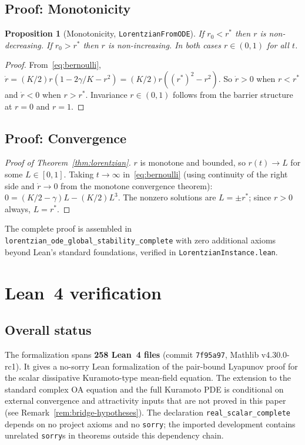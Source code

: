\documentclass[11pt,a4paper]{article}
\newtheorem{proposition}[theorem]{Proposition}
\theoremstyle{definition}
\begin{document}
\subsection{Proof: Monotonicity}\label{sec:mono}

\begin{proposition}[Monotonicity, \texttt{LorentzianFromODE}]\label{prop:mono}
If $r_0 < r^*$ then $r$ is non-decreasing. If $r_0 > r^*$ then $r$ is non-increasing. In both cases $r \in (0,1)$ for all $t$.
\end{proposition}

\begin{proof}
From~\eqref{eq:bernoulli}, $\dot{r} = (K/2)r(1-2\gamma/K - r^2) = (K/2)r((r^*)^2 - r^2)$. So $\dot{r} > 0$ when $r < r^*$ and $\dot{r} < 0$ when $r > r^*$. Invariance $r \in (0,1)$ follows from the barrier structure at $r = 0$ and $r = 1$.
\end{proof}

\subsection{Proof: Convergence}

\begin{proof}[Proof of Theorem~\ref{thm:lorentzian}]
$r$ is monotone and bounded, so $r(t) \to L$ for some $L \in [0,1]$. Taking $t \to \infty$ in~\eqref{eq:bernoulli} (using continuity of the right side and $\dot{r} \to 0$ from the monotone convergence theorem): $0 = (K/2 - \gamma)L - (K/2)L^3$. The nonzero solutions are $L = \pm r^*$; since $r > 0$ always, $L = r^*$.
\end{proof}

The complete proof is assembled in \texttt{lorentzian\_ode\_global\_stability\_complete} with zero additional axioms beyond Lean's standard foundations, verified in \texttt{LorentzianInstance.lean}.

\section{Lean~4 verification}\label{sec:lean}

\subsection{Overall status}

The formalization spans \textbf{258 Lean~4 files} (commit \texttt{7f95a97}, Mathlib v4.30.0-rc1). It gives a no-sorry Lean formalization of the pair-bound Lyapunov proof for the scalar dissipative Kuramoto-type mean-field equation. The extension to the standard complex OA equation and the full Kuramoto PDE is conditional on external convergence and attractivity inputs that are not proved in this paper (see Remark~\ref{rem:bridge-hypotheses}). The declaration \texttt{real\_scalar\_complete} depends on no project axioms and no \texttt{sorry}; the imported development contains unrelated \texttt{sorry}s in theorems outside this dependency chain.
\end{document}
